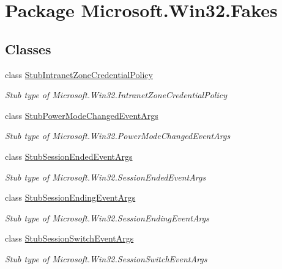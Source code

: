 \hypertarget{namespace_microsoft_1_1_win32_1_1_fakes}{\section{Package Microsoft.\-Win32.\-Fakes}
\label{namespace_microsoft_1_1_win32_1_1_fakes}
}
\subsection*{Classes}
\begin{DoxyCompactItemize}
\item 
class \hyperlink{class_microsoft_1_1_win32_1_1_fakes_1_1_stub_intranet_zone_credential_policy}{Stub\-Intranet\-Zone\-Credential\-Policy}
\begin{DoxyCompactList}\small\item\em Stub type of Microsoft.\-Win32.\-Intranet\-Zone\-Credential\-Policy\end{DoxyCompactList}\item 
class \hyperlink{class_microsoft_1_1_win32_1_1_fakes_1_1_stub_power_mode_changed_event_args}{Stub\-Power\-Mode\-Changed\-Event\-Args}
\begin{DoxyCompactList}\small\item\em Stub type of Microsoft.\-Win32.\-Power\-Mode\-Changed\-Event\-Args\end{DoxyCompactList}\item 
class \hyperlink{class_microsoft_1_1_win32_1_1_fakes_1_1_stub_session_ended_event_args}{Stub\-Session\-Ended\-Event\-Args}
\begin{DoxyCompactList}\small\item\em Stub type of Microsoft.\-Win32.\-Session\-Ended\-Event\-Args\end{DoxyCompactList}\item 
class \hyperlink{class_microsoft_1_1_win32_1_1_fakes_1_1_stub_session_ending_event_args}{Stub\-Session\-Ending\-Event\-Args}
\begin{DoxyCompactList}\small\item\em Stub type of Microsoft.\-Win32.\-Session\-Ending\-Event\-Args\end{DoxyCompactList}\item 
class \hyperlink{class_microsoft_1_1_win32_1_1_fakes_1_1_stub_session_switch_event_args}{Stub\-Session\-Switch\-Event\-Args}
\begin{DoxyCompactList}\small\item\em Stub type of Microsoft.\-Win32.\-Session\-Switch\-Event\-Args\end{DoxyCompactList}\item 

\end{DoxyCompactItemize}
